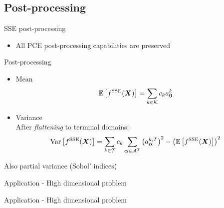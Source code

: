 \documentclass{rsuqbeamernew}
\begin{document}
\subsection{Post-processing}
\begin{frame}[t]{SSE post-processing}
	\small
	\begin{itemize}
		\item [] {\altx All} PCE post-processing capabilities are preserved
	\end{itemize}
	\pause
	\begin{block}{Post-processing}
		\begin{itemize}
			\item {\altx Mean}
			\begin{equation*}
			{\mathbb E}\left[ f^{\mathrm{SSE}}(\boldsymbol{X}) \right] = \sum_{k\in{\mathcal K}}c_ka_{\boldsymbol{0}}^{k}
			\end{equation*}
			\item {\altx Variance}\\
			After \emph{flattening} to terminal domains:			
			\begin{equation*}
			{\rm Var}\left[ f^{\mathrm{SSE}}(\boldsymbol{X}) \right] = 
			\sum_{k\in{\mathcal T}}c_k\sum_{\boldsymbol{\alpha}\in{\mathcal A}^{T}}	
			\left(a_{\boldsymbol{\alpha}}^{k,T}\right)^2 - 
			\left({\mathbb E}\left[ f^{\mathrm{SSE}}(\boldsymbol{X}) \right]\right)^2
			\end{equation*}
		\end{itemize}
	Also {\altx partial variance} (Sobol' indices)
	\end{block}
\end{frame}

\begin{frame}[t]{Application - High dimensional problem}
	\small
	\\
	\begin{center}
	\end{center}
\end{frame}

\begin{frame}[t]{Application - High dimensional problem}
	\small
	\\
	\begin{center}
	\end{center}
\end{frame}

\end{document}
